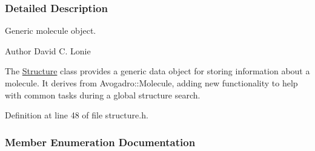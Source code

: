 \subsubsection{Detailed Description}
Generic molecule object. 

\begin{DoxyAuthor}{Author}
David C. Lonie
\end{DoxyAuthor}
The \hyperlink{classGlobalSearch_1_1Structure}{Structure} class provides a generic data object for storing information about a molecule. It derives from Avogadro\+::\+Molecule, adding new functionality to help with common tasks during a global structure search. 

Definition at line 48 of file structure.\+h.



\subsubsection{Member Enumeration Documentation}
\hypertarget{classGlobalSearch_1_1Structure_a3f1e44cb4f603fe1b3fbc8e813535917}{}
